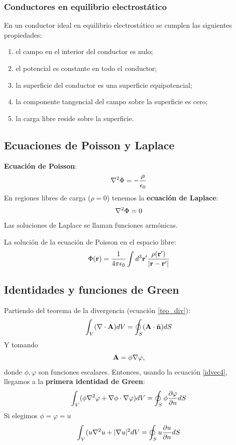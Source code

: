 \documentclass[]{article}
\numberwithin{equation}{section}
\begin{document}
\subsubsection{Conductores en equilibrio electrostático}
En un conductor ideal en equilibrio electrostático se cumplen las siguientes propiedades:
\begin{enumerate}
	\item el campo en el interior del conductor es nulo;
	\item el potencial es constante en todo el conductor;
	\item la superficie del conductor es una superficie equipotencial;
	\item la componente tangencial del campo sobre la superficie es cero;
	\item la carga libre reside sobre la superficie.
\end{enumerate}

\subsection{Ecuaciones de Poisson y Laplace}
\textbf{Ecuación de Poisson}:
\begin{equation}
	\nabla^2\Phi = - \frac{\rho}{\epsilon_{0}}
\end{equation}
En regiones libres de carga (\(\rho=0\)) tenemos la \textbf{ecuación de Laplace}:
\begin{equation}
	\nabla^2\Phi = 0
\end{equation}
Las soluciones de Laplace se llaman funciones armónicas.

La solución de la ecuación de Poisson en el espacio libre:
\begin{equation}
	\Phi(\rv) = \ke\int d^3\rv'\frac{\rho(\rv')}{|\rv-\rv'|}
\end{equation}

\subsection{Identidades y funciones de Green}
Partiendo del teorema de la divergencia (ecuación \ref{teo_div}):
\begin{equation*}
	\int_{V}(\nabla\cdot\mathbf{A})dV = \oint_{S}(\mathbf{A}\cdot\hat{\mathbf{n}})dS
\end{equation*}
Y tomando
\begin{equation*}
	\mathbf{A} = \phi\nabla\varphi,
\end{equation*}
donde \(\phi,\varphi\) son funciones escalares. Entonces, usando la ecuación \ref{idvec4}, llegamos a la \textbf{primera identidad de Green}:
\begin{equation}
	\int_{V}(\phi\nabla^2\varphi + \nabla\phi\cdot\nabla\varphi)dV = \oint_{S}\phi\frac{\partial\varphi}{\partial n}dS
	\label{1_id_green}
\end{equation}
Si elegimos \(\phi=\varphi=u\)
\begin{equation}
	\int_{V}(u\nabla^2 u + |\nabla u|^2dV = \oint_{S}u\frac{\partial u}{\partial n}dS
\end{equation}
\end{document}
